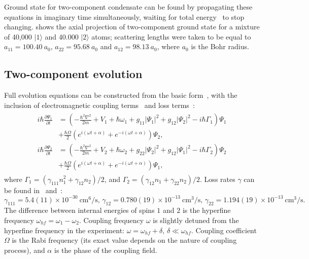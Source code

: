 Ground state for two-component condensate can be found by propagating these equations in imaginary time simultaneously,
waiting for total energy~ to stop changing.
 shows the axial projection of two-component ground state for a mixture of 40,000 $\vert 1 \rangle$ and 40.000 $\vert 2 \rangle$ atoms;
scattering lengths were taken to be equal to $a_{11} = 100.40\ a_0$, $a_{22} = 95.68\ a_0$ and $a_{12} = 98.13\ a_0$, where $a_0$ is the Bohr radius.


\subsection{Two-component evolution}

Full evolution equations can be constructed from the basic form~,
with the inclusion of electromagnetic coupling terms~\cite{Pitaevskii2003}
and loss terms~\cite{Mertes2007}:
\begin{align}
\label{eqn:mean-field:two-comp-evolution-cgpes}
\begin{split}
	i \hbar \frac{\partial \Psi_1}{\partial t} & = \left(
		-\frac{\hbar^2 \nabla^2}{2 m} + V_1 + \hbar \omega_1
		+ g_{11} \lvert \Psi_1 \rvert^2
		+ g_{12} \lvert \Psi_2 \rvert^2
		- i \hbar \Gamma_1
	\right) \Psi_1 \\
	& + \frac{\hbar \Omega}{2} \left(
		e^{i (\omega t + \alpha)} + e^{-i (\omega t + \alpha)}
	\right) \Psi_2, \\
	i \hbar \frac{\partial \Psi_2}{\partial t} & = \left(
		-\frac{\hbar^2 \nabla^2}{2 m} + V_2 + \hbar \omega_2
		+ g_{22} \lvert \Psi_2 \rvert^2
		+ g_{12} \lvert \Psi_1 \rvert^2
		- i \hbar \Gamma_2
	\right) \Psi_2 \\
	& + \frac{\hbar \Omega}{2} \left(
		e^{i (\omega t + \alpha)} + e^{-i (\omega t + \alpha)}
	\right) \Psi_1,
\end{split}
\end{align}
where $\Gamma_1 = \left( \gamma_{111} n_1^2 + \gamma_{12} n_2 \right) / 2$,
and $\Gamma_2 = \left( \gamma_{12} n_1 + \gamma_{22} n_2 \right) / 2$.
Loss rates $\gamma$ can be found in~\cite{Mertes2007} and~\cite{Burt1997}:
\[
	\gamma_{111} = 5.4(11) \times 10^{-30}\ \textrm{cm}^6/\textrm{s},\,
	\gamma_{12} = 0.780(19) \times 10^{-13}\ \textrm{cm}^3/\textrm{s},\,
	\gamma_{22} = 1.194(19) \times 10^{-13}\ \textrm{cm}^3/\textrm{s}.
\]
The difference between internal energies of spins $1$ and $2$ is the hyperfine frequency $\omega_{hf} = \omega_1 - \omega_2$.
Coupling frequency $\omega$ is slightly detuned from the hyperfine frequency in the experiment:
$\omega = \omega_{hf} + \delta,\, \delta \ll \omega_{hf}$.
Coupling coefficient $\Omega$ is the Rabi frequency (its exact value depends on the nature of coupling process),
and $\alpha$ is the phase of the coupling field.

